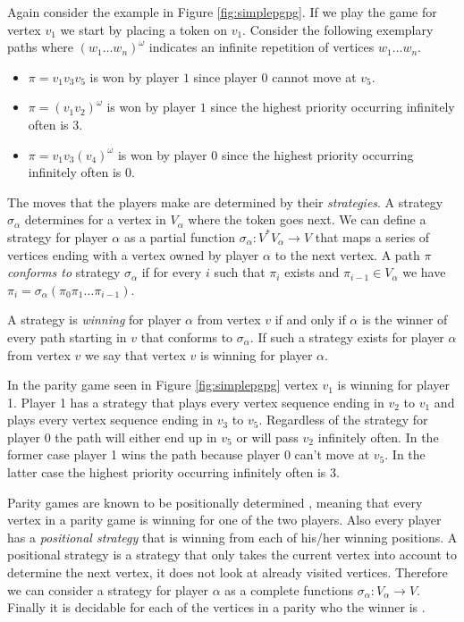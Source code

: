 \begin{example}
	Again consider the example in Figure \ref{fig:simplepgpg}. If we play the game for vertex $v_1$ we start by placing a token on $v_1$. Consider the following exemplary paths where $(w_1{\dots}w_n)^\omega$ indicates an infinite repetition of vertices $w_1{\dots}w_n$.
	\begin{itemize}
		\item $\pi = v_1v_3v_5$ is won by player $1$ since player $0$ cannot move at $v_5$.
		\item $\pi = (v_1v_2)^\omega$ is won by player $1$ since the highest priority occurring infinitely often is 3.
		\item $\pi = v_1v_3(v_4)^\omega$ is won by player $0$ since the highest priority occurring infinitely often is $0$.
	\end{itemize}
\end{example}

The moves that the players make are determined by their \textit{strategies}. A strategy $\sigma_\alpha$ determines for a vertex in $V_\alpha$ where the token goes next. We can define a strategy for player $\alpha$ as a partial function $\sigma_\alpha : V^*V_\alpha \rightarrow V$ that maps a series of vertices ending with a vertex owned by player $\alpha$ to the next vertex. A path $\pi$ \textit{conforms to} strategy $\sigma_\alpha$ if for every $i$ such that $\pi_i$ exists and $\pi_{i-1} \in V_\alpha$ we have $\pi_i = \sigma_\alpha(\pi_0\pi_1\dots\pi_{i-1})$.

A strategy is \textit{winning} for player $\alpha$ from vertex $v$ if and only if $\alpha$ is the winner of every path starting in $v$ that conforms to $\sigma_\alpha$. If such a strategy exists for player $\alpha$ from vertex $v$ we say that vertex $v$ is winning for player $\alpha$.

\begin{example}
	In the parity game seen in Figure \ref{fig:simplepgpg} vertex $v_1$ is winning for player 1. Player 1 has a strategy that plays every vertex sequence ending in $v_2$ to $v_1$ and plays every vertex sequence ending in $v_3$ to $v_5$. Regardless of the strategy for player 0 the path will either end up in $v_5$ or will pass $v_2$ infinitely often. In the former case player 1 wins the path because player 0 can't move at $v_5$. In the latter case the highest priority occurring infinitely often is 3.
\end{example}

Parity games are known to be positionally determined \cite{Bradfield2018}, meaning that every vertex in a parity game is winning for one of the two players. Also every player has a \textit{positional strategy} that is winning from each of his/her winning positions. A positional strategy is a strategy that only takes the current vertex into account to determine the next vertex, it does not look at already visited vertices. Therefore we can consider a strategy for player $\alpha$ as a complete functions $\sigma_\alpha : V_\alpha \rightarrow V$. Finally it is decidable for each of the vertices in a parity who the winner is \cite{Bradfield2018}.

